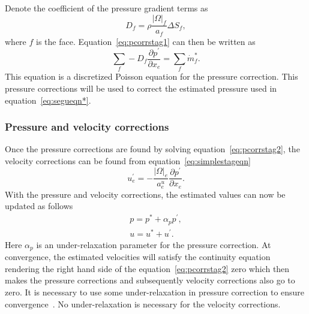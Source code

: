 Denote the coefficient of the pressure gradient terms as
\begin{equation}
D_f = \rho \frac{|\Omega|_f}{a_f} \Delta S_f,
\label{eq:ch2dfeqn}
\end{equation}
where $f$ is the face. Equation~\ref{eq:pcorrstag1} can then be written as
\begin{equation}
\sum_f -D_f \frac{\partial p^{\prime}}{\partial x_e} = \sum_f \dot{m}_f^{\ast}.
\label{eq:pcorrstag2}
\end{equation}
This equation is a discretized Poisson equation for the pressure correction. This pressure corrections will be used to correct the estimated pressure used in equation~\ref{eq:segueqn*}. 

\subsubsection{Pressure and velocity corrections}
Once the pressure corrections are found by solving equation~\ref{eq:pcorrstag2}, the velocity corrections can be found from equation~\ref{eq:simplestageqn}
\begin{equation*}
u_e^{\prime} = -\frac{|\Omega|_e}{a_e^u} \frac{\partial p^{\prime}}{\partial x_e}.
\end{equation*}
With the pressure and velocity corrections, the estimated values can now be updated as follows
\begin{eqnarray}
p = p^{\ast} + \alpha_p p^{\prime}, \label{eq:pcorrstg}\\
u = u^{\ast} + u^{\prime}.\label{eq:ucorrstg}
\end{eqnarray}
Here $\alpha_p$ is an under-relaxation parameter for the pressure correction. At convergence, the estimated velocities will satisfy the continuity equation rendering the right hand side of the equation~\ref{eq:pcorrstag2} zero which then makes the pressure corrections and subsequently velocity corrections also go to zero. It is necessary to use some under-relaxation in pressure correction to ensure convergence~\cite{Ferziger2002, Moukalled, Patankar1972}. No under-relaxation is necessary for the velocity corrections.

